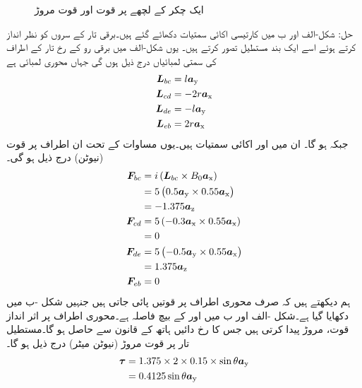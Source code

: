 \begin{figure}
%
\caption{ایک چکر کے لچھے پر قوت اور قوت مروڑ}
\label{شکل_تبادلہ_طاقت_لچھے_پر_قوت_اور_مروڑ}
\end{figure}
%
حل:\quad
شکل-الف اور ب میں کارتیسی اکائی سمتیات دکھائے  گئے ہیں۔برقی تار کے سروں کو نظر انداز کرتے ہوئے  اسے ایک بند مستطیل تصور کرتے ہیں۔ یوں   شکل-الف میں  برقی رو کے رخ تار کے اطراف کی سمتی لمبائیاں  درج ذیل ہوں گی جہاں  محوری لمبائی ہے
\begin{align*}
{\ensuremath{{\boldsymbol{L}}}}_{bc}&=l {\boldsymbol{a}}_{\textup{y}}\\
{{\boldsymbol{L}}}_{cd}&=-2 r {\boldsymbol{a}}_{\textup{x}}\\
{{\boldsymbol{L}}}_{de}&=-l {\boldsymbol{a}}_{\textup{y}}\\
{{\boldsymbol{L}}}_{eb}&=2 r {\boldsymbol{a}}_{\textup{x}}
\end{align*}
 جبکہ  ہو گا۔ ان میں  اور  اکائی سمتیات ہیں۔یوں مساوات   کے تحت ان اطراف پر قوت (نیوٹن) درج ذیل ہو گی۔
\begin{align*}
{\ensuremath{{\boldsymbol{F}}}}_{bc}&= i \left({{\boldsymbol{L}}}_{bc} \times B_0 {\boldsymbol{a}}_{\textup{x}} \right)\\
&=5 \left(0.5 {\boldsymbol{a}}_{\textup{y}} \times 0.55 {\boldsymbol{a}}_{\textup{x}} \right)\\
&=-1.375 {\boldsymbol{a}}_{\textup{z}}\\
{{\boldsymbol{F}}}_{cd}&= 5\left(-0.3{\boldsymbol{a}}_{\textup{x}} \times 0.55 {\boldsymbol{a}}_{\textup{x}} \right)\\
&=0\\
{{\boldsymbol{F}}}_{de}&= 5 \left(-0.5{\boldsymbol{a}}_{\textup{y}} \times 0.55 {\boldsymbol{a}}_{\textup{x}} \right)\\
&=1.375 {\boldsymbol{a}}_{\textup{z}}\\
{{\boldsymbol{F}}}_{eb}&= 0
\end{align*}
ہم دیکھتے ہیں کہ  صرف محوری  اطراف پر قوتیں  پائی جاتی  ہیں جنہیں شکل -ب  میں دکھایا گیا ہے۔شکل -الف اور ب میں  اور  کے بیچ فاصلہ  ہے۔محوری اطراف پر اثر انداز قوت، مروڑ پیدا کرتی ہیں جس کا رخ  دائیں ہاتھ کے قانون سے حاصل ہو گا۔مستطیل تار پر قوت مروڑ (نیوٹن میٹر)  درج ذیل ہو گا۔
\begin{align*}
{\ensuremath{{\boldsymbol{\tau}}}}&=1.375 \times 2 \times 0.15 \times \sin \theta {\boldsymbol{a}}_{\textup{y}}\\
&=0.4125 \sin \theta {\boldsymbol{a}}_{\textup{y}}
\end{align*}
%

